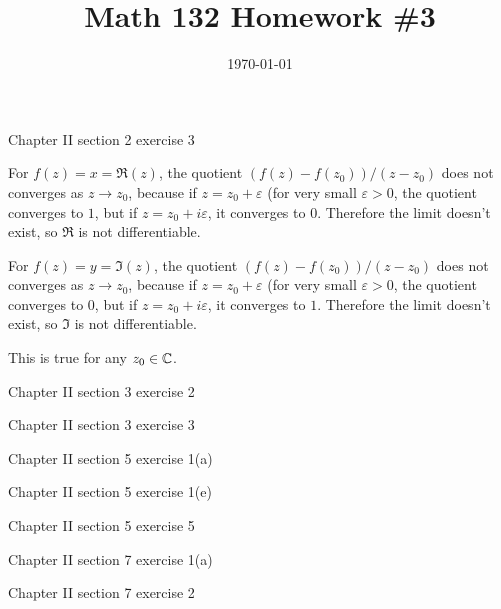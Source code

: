 \documentclass{article}
\date{\today}
\title{Math 132 Homework \#3}
\begin{document}
\maketitle

\begin{prob}
    Chapter II section 2 exercise 3
\end{prob}
For $f(z) = x = \Re(z)$, the quotient $(f(z)-f(z_0))/(z-z_0)$ does not converges as $z \rightarrow z_0$, because if $z = z_0 + \varepsilon$ (for very small $\varepsilon > 0$, the quotient converges to $1$, but if $z = z_0 + i\varepsilon$, it converges to $0$. Therefore the limit doesn't exist, so $\Re$ is not differentiable.
\par
For $f(z) = y = \Im(z)$, the quotient $(f(z)-f(z_0))/(z-z_0)$ does not converges as $z \rightarrow z_0$, because if $z = z_0 + \varepsilon$ (for very small $\varepsilon > 0$, the quotient converges to $0$, but if $z = z_0 + i\varepsilon$, it converges to $1$. Therefore the limit doesn't exist, so $\Im$ is not differentiable.
\par
This is true for any $z_0 \in \mathbb{C}$.

\bigskip
\par
\begin{prob}
    Chapter II section 3 exercise 2
\end{prob}

\bigskip
\par
\begin{prob}
    Chapter II section 3 exercise 3
\end{prob}

\bigskip
\par
\begin{prob}
    Chapter II section 5 exercise 1(a)
\end{prob}

\bigskip
\par
\begin{prob}
    Chapter II section 5 exercise 1(e)
\end{prob}

\bigskip
\par
\begin{prob}
    Chapter II section 5 exercise 5
\end{prob}

\bigskip
\par
\begin{prob}
    Chapter II section 7 exercise 1(a)
\end{prob}

\bigskip
\par
\begin{prob}
    Chapter II section 7 exercise 2
\end{prob}



\end{document}

